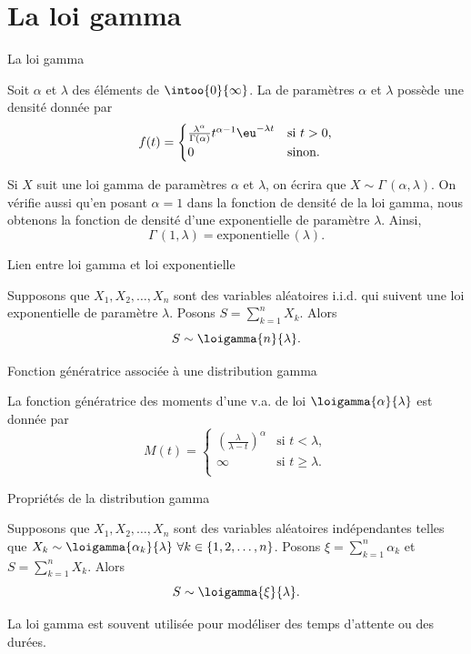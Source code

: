 \documentclass[nuit,charter,pied]{BeamerJS}
\begin{document}
\section{La loi gamma}
\begin{frame}{La loi gamma}
	\begin{defn}{}
		Soit $\alpha$ et $\lambda$ des éléments de $\intoo{0}{\infty}$. La  de paramètres $\alpha$ et $\lambda$ possède une densité donnée par
		\[f(t)=\begin{cases}
			\frac{\lambda^{\alpha}}{\Gamma(\alpha)}t^{\alpha-1}\eu^{-\lambda t} &\text{si $t>0$,}\\
			0 & \text{sinon.}
		\end{cases}\]
	\end{defn}
Si $X$ suit une loi gamma de paramètres $\alpha$ et $\lambda$, on écrira que $X\sim \Gamma\,(\alpha,\lambda)$. On vérifie aussi qu'en posant $\alpha=1$ dans la fonction de densité de la loi gamma, nous obtenons la fonction de densité d'une exponentielle de paramètre $\lambda$. Ainsi,
\[\Gamma\,(1,\lambda)=\text{exponentielle}\,(\lambda).\]
\end{frame}
\begin{frame}[t]{Lien entre loi gamma et loi exponentielle}
	\begin{thm}
		Supposons que $X_1,X_2,\ldots,X_n$ sont des variables aléatoires i.i.d. qui suivent une loi exponentielle de paramètre $\lambda$. Posons $S=\sum_{k=1}^nX_k$. Alors
		\[S\sim \loigamma{n}{\lambda}.\]
	\end{thm}
\end{frame}
\begin{frame}{Fonction génératrice associée à une distribution gamma}
	\begin{thm}
		La fonction génératrice des moments d'une v.a. de loi $\loigamma{\alpha}{\lambda}$ est donnée par
		\[M(t)=\begin{cases}
			\left(\frac{\lambda}{\lambda -t}\right)^{\alpha}&\text{si $t<\lambda$},\\
			\infty & \text{si $t\geq\lambda$}.\\
		\end{cases}\]
	\end{thm}
	\end{frame}
	\begin{frame}{Propriétés de la distribution gamma}
	\begin{thm}
		Supposons que $X_1,X_2,\ldots,X_n$ sont des variables aléatoires indépendantes telles que $X_k\sim \loigamma{\alpha_k}{\lambda}~\forall k\in\{1,2,\ldots, n\}$. Posons $\xi=\sum_{k=1}^n\alpha_k$ et $S=\sum_{k=1}^nX_k$. Alors
		\[S\sim \loigamma{\xi}{\lambda}.\]
	\end{thm}
	La loi gamma est souvent utilisée pour modéliser des temps d'attente ou des durées.
\end{frame}
\end{document}
